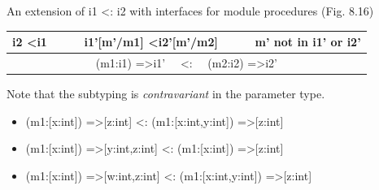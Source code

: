 \documentclass{article}
\begin{document}
\begin{huge}

An extension of i1 \textless: i2 with interfaces for module procedures (Fig. 8.16)
\begin{center}
\begin{tabular}{c}
i2 \textless i1 \ \ \ \ \ i1'[m'/m1] \textless i2'[m'/m2] \ \ \ \ \ m' not in i1' or i2'  \\ \hline
(m1:i1) =\textgreater i1' \ \ \textless: \ \ (m2:i2) =\textgreater i2'
\end{tabular}
\end{center}

Note that the subtyping is {\it contravariant} in the parameter type.
\begin{itemize}
\item (m1:[x:int]) =\textgreater [z:int] \textless: (m1:[x:int,y:int]) =\textgreater [z:int]
\item (m1:[x:int]) =\textgreater [y:int,z:int] \textless: (m1:[x:int]) =\textgreater [z:int]
\item (m1:[x:int]) =\textgreater [w:int,z:int] \textless: (m1:[x:int,y:int]) =\textgreater [z:int] 
\end{itemize}



\end{huge} 
\end{document}
